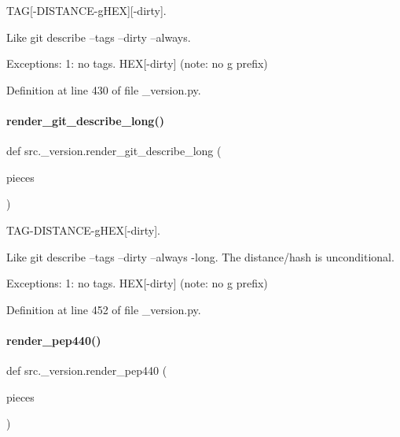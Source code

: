 T\+AG\mbox{[}-\/\+D\+I\+S\+T\+A\+N\+C\+E-\/g\+H\+EX\mbox{]}\mbox{[}-\/dirty\mbox{]}. 

Like \textquotesingle{}git describe --tags --dirty --always\textquotesingle{}.

Exceptions\+: 1\+: no tags. H\+EX\mbox{[}-\/dirty\mbox{]} (note\+: no \textquotesingle{}g\textquotesingle{} prefix) 

Definition at line 430 of file \+\_\+version.\+py.

\mbox{\label{namespacesrc_1_1__version_aefa841fcd557dd2ff3594846803f1e58}} 
\paragraph{\texorpdfstring{render\+\_\+git\+\_\+describe\+\_\+long()}{render\_git\_describe\_long()}}
{\footnotesize\ttfamily def src.\+\_\+version.\+render\+\_\+git\+\_\+describe\+\_\+long (\begin{DoxyParamCaption}\item[{}]{pieces }\end{DoxyParamCaption})}



T\+A\+G-\/\+D\+I\+S\+T\+A\+N\+C\+E-\/g\+H\+EX\mbox{[}-\/dirty\mbox{]}. 

Like \textquotesingle{}git describe --tags --dirty --always -\/long\textquotesingle{}. The distance/hash is unconditional.

Exceptions\+: 1\+: no tags. H\+EX\mbox{[}-\/dirty\mbox{]} (note\+: no \textquotesingle{}g\textquotesingle{} prefix) 

Definition at line 452 of file \+\_\+version.\+py.

\mbox{\label{namespacesrc_1_1__version_a08b184a852fca45124c31efad07ae91d}} 
\paragraph{\texorpdfstring{render\+\_\+pep440()}{render\_pep440()}}
{\footnotesize\ttfamily def src.\+\_\+version.\+render\+\_\+pep440 (\begin{DoxyParamCaption}\item[{}]{pieces }\end{DoxyParamCaption})}



